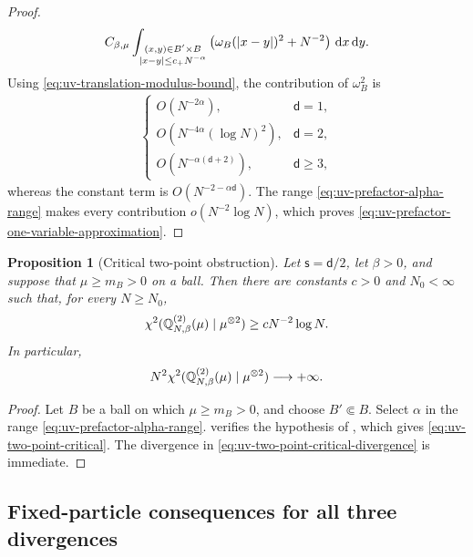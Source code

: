 \documentclass[11pt,reqno]{amsart}
\numberwithin{equation}{section}
\theoremstyle{plain}
\newtheorem{prop}[prop]{Proposition}
\theoremstyle{remark}
\DeclarePairedDelimiter{\pa}{\lparen}{\rparen}
\DeclarePairedDelimiter{\abs}{\lvert}{\rvert}
\renewcommand{\d}{\mathsf{d}}
\newcommand{\md}{\mathrm{d}}
\newcommand{\Q}{{\mathbb{Q}}}
\newcommand{\be}{\beta}
\newcommand{\s}{\mathsf{s}}
\newcommand{\Chi}{\chi^2}
\begin{document}
\begin{proof}
\begin{align}
 C_{\be,\mu}
 \int_{\substack{(x,y)\in B'\times B\\
 \abs{x-y}\le c_+N^{-\alpha}}}
 \left(\omega_B(\abs{x-y})^2+N^{-2}\right)\,\md x\,\md y.
\end{align}
Using \eqref{eq:uv-translation-modulus-bound}, the contribution of \(\omega_B^2\) is
\begin{align}\label{eq:uv-prefactor-error-rates}
 \begin{cases}
 O(N^{-2\alpha}),&\d=1,\\
 O(N^{-4\alpha}(\log N)^2),&\d=2,\\
 O(N^{-\alpha(\d+2)}),&\d\ge3,
 \end{cases}
\end{align}
whereas the constant term is \(O(N^{-2-\alpha\d})\).  The range \eqref{eq:uv-prefactor-alpha-range} makes every contribution \(o(N^{-2}\log N)\), which proves \eqref{eq:uv-prefactor-one-variable-approximation}.
\end{proof}

\begin{prop}[Critical two-point obstruction]
\label{prop:uv-two-point-critical}
Let \(\s=\d/2\), let \(\be>0\), and suppose that \(\mu\ge m_B>0\) on a ball.  Then there are constants \(c>0\) and \(N_0<\infty\) such that, for every \(N\ge N_0\),
\begin{align}\label{eq:uv-two-point-critical}
 \Chi\pa{\Q_{N,\be}^{(2)}(\mu)\mid\mu^{\otimes2}}
 \ge cN^{-2}\log N.
\end{align}
In particular,
\begin{align}\label{eq:uv-two-point-critical-divergence}
 N^2\Chi\pa{\Q_{N,\be}^{(2)}(\mu)\mid\mu^{\otimes2}}
 \longrightarrow+\infty.
\end{align}
\end{prop}

\begin{proof}
Let \(B\) be a ball on which \(\mu\ge m_B>0\), and choose \(B'\Subset B\).  Select \(\alpha\) in the range \eqref{eq:uv-prefactor-alpha-range}.   verifies the hypothesis of , which gives \eqref{eq:uv-two-point-critical}.  The divergence in \eqref{eq:uv-two-point-critical-divergence} is immediate.
\end{proof}

\subsection{Fixed-particle consequences for all three divergences}
\label{subsec:uv-fixed-particle-consequences}
\end{document}
